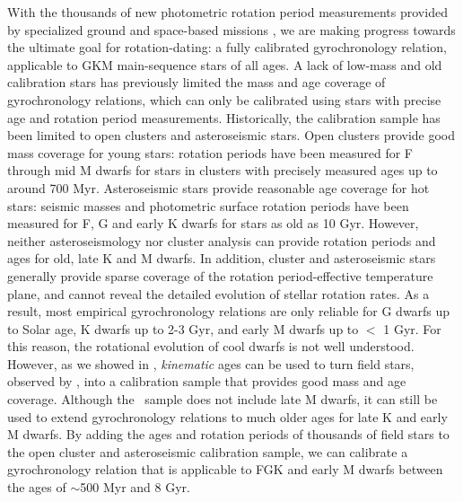 With the thousands of new photometric rotation period measurements provided by
specialized ground and space-based missions \citep[particularly \kepler/\ktwo\
and \tess][]{borucki2010, howell2014, ricker2015}, we are making progress
towards the ultimate goal for rotation-dating: a fully calibrated
gyrochronology relation, applicable to GKM main-sequence stars of all ages.
A lack of low-mass and old calibration stars has previously limited the mass
and age coverage of gyrochronology relations, which can only be calibrated
using stars with precise age and rotation period measurements.
Historically, the calibration sample has been limited to open clusters and
asteroseismic stars.
Open clusters provide good mass coverage for young stars: rotation periods
have been measured for F through mid M dwarfs for stars in clusters with
precisely measured ages up to around 700 Myr.
Asteroseismic stars provide reasonable age coverage for hot stars: seismic
masses and photometric surface rotation periods have been measured for F, G
and early K dwarfs for stars as old as 10 Gyr.
However, neither asteroseismology nor cluster analysis can provide rotation
periods and ages for old, late K and M dwarfs.
In addition, cluster and asteroseismic stars generally provide sparse coverage
of the rotation period-effective temperature plane, and cannot reveal the
detailed evolution of stellar rotation rates.
As a result, most empirical gyrochronology relations are only reliable for G
dwarfs up to Solar age, K dwarfs up to 2-3 Gyr, and early M dwarfs up to $<$ 1
Gyr.
For this reason, the rotational evolution of cool dwarfs is not well
understood.
However, as we showed in \citet{angus2020}, {\it kinematic} ages can be used
to turn field stars, observed by \kepler, into a calibration sample that
provides good mass and age coverage.
Although the \kepler\ sample does not include late M dwarfs, it can still be
used to extend gyrochronology relations to much older ages for late K and
early M dwarfs.
By adding the ages and rotation periods of thousands of field stars to the
open cluster and asteroseismic calibration sample, we can calibrate a
gyrochronology relation that is applicable to FGK and early M dwarfs between
the ages of $\sim$500 Myr and 8 Gyr.

